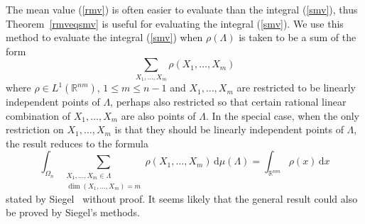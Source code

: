 \documentclass[11pt]{article}
\theoremstyle{definition}
\theoremstyle{proof}
\begin{document}
The mean value (\ref{rmv}) is often easier to evaluate than the integral (\ref{smv}), thus Theorem~\ref{rmveqsmv} is useful for evaluating the integral (\ref{smv}).
We use this method to evaluate the integral (\ref{smv}) when $\rho (\Lambda )$ is taken to be a sum of the form
\[
    \sum_{X_1, \ldots, X_m} \rho (X_1, \ldots, X_m) 
\]
where $\rho \in L^1(\mathbb{R}^{nm})$, $1\leq  m \leq n-1$ and $X_1, \ldots, X_m$ are restricted to be linearly independent points of $\Lambda$, perhaps also restricted so that certain rational linear combination of $X_1, \ldots, X_m$ are also points of $\Lambda$.
In the special case, when the only restriction on $X_1, \ldots, X_m$ is that they should be linearly independent points of $\Lambda$, the result reduces to the formula
\[
    \int_{{\Omega}_n} \sum_{\substack{X_1, \ldots, X_m \in \Lambda \\ \dim (X_1, \ldots, X_m) = m}} \rho (X_1, \ldots, X_m) \, \mathrm{d} \mu (\Lambda ) = \int_{\mathbb{R}^{nm}} \rho (x) \, \mathrm{d} x
\]
stated by Siegel~\cite{siegel45} without proof.
It seems likely that the general result could also be proved by Siegel's methods.
\end{document}
